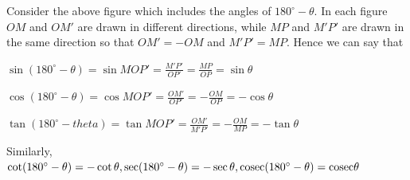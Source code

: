 Consider the above figure which includes the angles of $180^\circ - \theta$. In each figure $OM$ and $OM'$ are drawn in different
directions, while $MP$ and $M'P'$ are drawn in the same direction so that $OM'=-OM$ and $M'P' = MP$. Hence we can say that

$\sin(180^\circ - \theta) = \sin MOP' = \frac{M'P'}{OP'} = \frac{MP}{OP} = \sin\theta$

$\cos(180^\circ - \theta) = \cos MOP' = \frac{OM'}{OP'} = -\frac{OM}{OP} = -\cos\theta$

$\tan(180^\circ - theta) = \tan MOP' = \frac{OM'}{M'P'} = -\frac{OM}{MP} = -\tan\theta$

Similarly, $\cot(180^\circ - \theta) = -\cot\theta, \sec(180^\circ - \theta) = -\sec\theta, {\rm cosec}(180^\circ - \theta) = {\rm
cosec}\theta$

